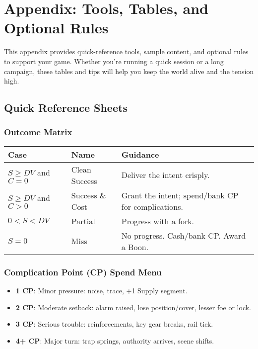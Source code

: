 \chapter{Appendix: Tools, Tables, and Optional Rules}

This appendix provides quick-reference tools, sample content, and optional rules to support your game. Whether you're running a quick session or a long campaign, these tables and tips will help you keep the world alive and the tension high.

\section*{Quick Reference Sheets}

\subsection*{Outcome Matrix}

\begin{center}
\begin{tabular}{lll}
\toprule
\textbf{Case} & \textbf{Name} & \textbf{Guidance} \\
\midrule
$S \geq DV$ and $C = 0$ & Clean Success\index{Clean Success} & Deliver the intent crisply. \\
$S \geq DV$ and $C > 0$ & Success \& Cost\index{Success \& Cost} & Grant the intent; spend/bank CP for complications. \\
$0 < S < DV$ & Partial\index{Partial} & Progress with a fork. \\
$S = 0$ & Miss\index{Miss} & No progress. Cash/bank CP. Award a Boon. \\
\bottomrule
\end{tabular}
\end{center}

\subsection*{Complication Point (CP) Spend Menu}

\begin{itemize}
    \item \textbf{1 CP}: Minor pressure: noise, trace, +1 Supply segment.
    \item \textbf{2 CP}: Moderate setback: alarm raised, lose position/cover, lesser foe or lock.
    \item \textbf{3 CP}: Serious trouble: reinforcements, key gear breaks, rail tick.
    \item \textbf{4+ CP}: Major turn: trap springs, authority arrives, scene shifts.
\end{itemize}

